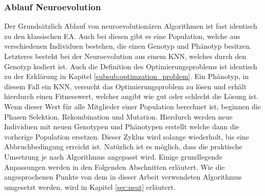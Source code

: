 \subsubsection{Ablauf Neuroevolution}
Der Grundsätzlich Ablauf von neuroevolutionären Algorithmen ist fast identisch zu den klassischen \ac{EA}. Auch bei diesen gibt es eine Population, welche aus verschiedenen Individuen bestehen, die einen Genotyp und Phänotyp besitzen. Letzteres besteht bei der Neuroevolution aus einem \ac{KNN}, welches durch den Genotyp kodiert ist. Auch die Definition des Optimierungsproblems ist identisch zu der Erklärung in Kapitel \ref{subsub:optimzation_problem}. Ein Phänotyp, in diesem Fall ein \ac{KNN}, versucht das Optimierungsproblem zu lösen und erhält hierdurch einen Fitnesswert, welcher angibt wie gut oder schlecht die Lösung ist. Wenn dieser Wert für alle Mitglieder einer Population berechnet ist, beginnen die Phasen Selektion, Rekombination und Mutation. Hierdurch werden neue Individuen mit neuen Genotypen und Phänotypen erstellt welche dann die vorherige Population ersetzen. Dieser Zyklus wird solange wiederholt, bis eine Abbruchbedingung erreicht ist. Natürlich ist es möglich, dass die praktische Umsetzung je nach Algorithmus angepasst wird. Einige grundlegende Anpassungen werden in den Folgenden Abschnitten erläutert. Wie die angesprochenen Punkte von dem in dieser Arbeit verwendeten Algorithmus umgesetzt werden, wird in Kapitel \ref{sec:neat} erläutert.



